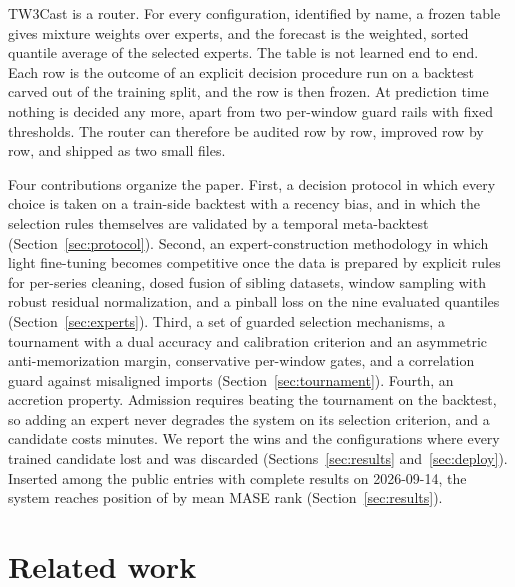 \documentclass[11pt]{article}
\begin{document}
TW3Cast is a router. For every configuration, identified by name, a frozen
table gives mixture weights over experts, and the forecast is the weighted,
sorted quantile average of the selected experts. The table is not learned
end to end. Each row is the outcome of an explicit decision procedure run
on a backtest carved out of the training split, and the row is then
frozen. At prediction time nothing is decided any more, apart from two
per-window guard rails with fixed thresholds. The router can therefore be
audited row by row, improved row by row, and shipped as two small files.

Four contributions organize the paper. First, a decision protocol in which
every choice is taken on a train-side backtest with a recency bias, and in
which the selection rules themselves are validated by a temporal
meta-backtest (Section~\ref{sec:protocol}). Second, an expert-construction
methodology in which light fine-tuning becomes competitive once the data
is prepared by explicit rules for per-series cleaning, dosed fusion of
sibling datasets, window sampling with robust residual normalization, and
a pinball loss on the nine evaluated quantiles
(Section~\ref{sec:experts}). Third, a set of
guarded selection mechanisms, a tournament with a dual accuracy and
calibration criterion and an asymmetric anti-memorization margin,
conservative per-window gates, and a correlation guard against misaligned
imports (Section~\ref{sec:tournament}). Fourth, an accretion property. Admission
requires beating the tournament on the backtest, so adding an expert never
degrades the system on its selection criterion, and a candidate costs
minutes. We report the wins and the configurations where every trained
candidate lost and was discarded (Sections~\ref{sec:results}
and~\ref{sec:deploy}). Inserted among the \nPublic{} public entries with complete
results on 2026-09-14, the system reaches position \ourPos{} of \nEntries{} by mean MASE rank
(Section~\ref{sec:results}).

\section{Related work}
\label{sec:related}
\end{document}

